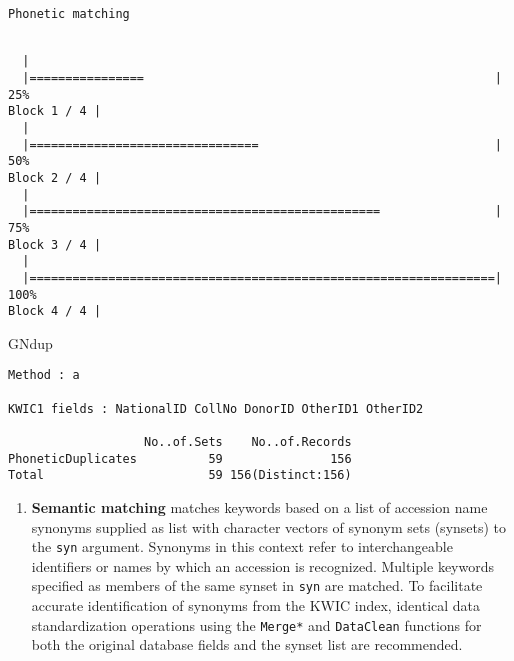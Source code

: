 \documentclass[]{article}
\newenvironment{Shaded}{\begin{snugshade}}{\end{snugshade}}
\newcommand{\NormalTok}[1]{#1}
\providecommand{\tightlist}{%
  \setlength{\itemsep}{0pt}\setlength{\parskip}{0pt}}
\begin{document}
\begin{verbatim}
Phonetic matching
\end{verbatim}

\begin{verbatim}

  |                                                                       
  |================                                                 |  25%
Block 1 / 4 |
  |                                                                       
  |================================                                 |  50%
Block 2 / 4 |
  |                                                                       
  |=================================================                |  75%
Block 3 / 4 |
  |                                                                       
  |=================================================================| 100%
Block 4 / 4 |
\end{verbatim}

\begin{Shaded}
\begin{Highlighting}[]
\NormalTok{GNdup}
\end{Highlighting}
\end{Shaded}

\begin{verbatim}
Method : a

KWIC1 fields : NationalID CollNo DonorID OtherID1 OtherID2
 
                   No..of.Sets    No..of.Records
PhoneticDuplicates          59               156
Total                       59 156(Distinct:156)
\end{verbatim}

\begin{enumerate}
\def\labelenumi{\arabic{enumi}.}
\setcounter{enumi}{2}
\tightlist
\item
  \textbf{Semantic matching} matches keywords based on a list of
  accession name synonyms supplied as list with character vectors of
  synonym sets (synsets) to the \texttt{syn} argument. Synonyms in this
  context refer to interchangeable identifiers or names by which an
  accession is recognized. Multiple keywords specified as members of the
  same synset in \texttt{syn} are matched. To facilitate accurate
  identification of synonyms from the KWIC index, identical data
  standardization operations using the \texttt{Merge*} and
  \texttt{DataClean} functions for both the original database fields and
  the synset list are recommended.
\end{enumerate}
\end{document}
